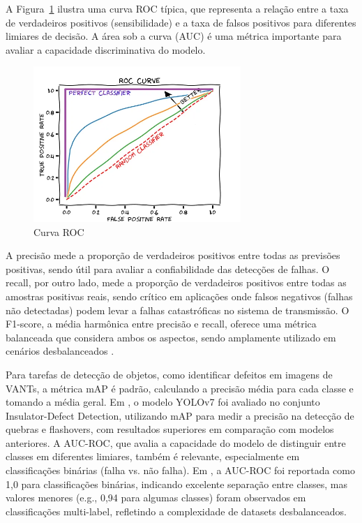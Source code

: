 A Figura~\ref{fig:roc_curve} ilustra uma curva ROC típica, que representa a relação entre a taxa de verdadeiros positivos (sensibilidade) e a taxa de falsos positivos para diferentes limiares de decisão. A área sob a curva (AUC) é uma métrica importante para avaliar a capacidade discriminativa do modelo.

\begin{figure}[H]
    \centering
    \caption{\label{fig:roc_curve}Curva ROC}
    \includegraphics[width=0.7\textwidth]{img/revisao_bibliografica/curva_roc.png}
\end{figure}

A precisão mede a proporção de verdadeiros positivos entre todas as previsões positivas, sendo útil para avaliar a confiabilidade das detecções de falhas. O recall, por outro lado, mede a proporção de verdadeiros positivos entre todas as amostras positivas reais, sendo crítico em aplicações onde falsos negativos (falhas não detectadas) podem levar a falhas catastróficas no sistema de transmissão. O F1-score, a média harmônica entre precisão e recall, oferece uma métrica balanceada que considera ambos os aspectos, sendo amplamente utilizado em cenários desbalanceados \cite{johnson2019survey}.

Para tarefas de detecção de objetos, como identificar defeitos em imagens de VANTs, a métrica mAP é padrão, calculando a precisão média para cada classe e tomando a média geral. Em , o modelo YOLOv7 foi avaliado no conjunto Insulator-Defect Detection, utilizando mAP para medir a precisão na detecção de quebras e flashovers, com resultados superiores em comparação com modelos anteriores. A AUC-ROC, que avalia a capacidade do modelo de distinguir entre classes em diferentes limiares, também é relevante, especialmente em classificações binárias (falha vs. não falha). Em , a AUC-ROC foi reportada como 1,0 para classificações binárias, indicando excelente separação entre classes, mas valores menores (e.g., 0,94 para algumas classes) foram observados em classificações multi-label, refletindo a complexidade de datasets desbalanceados.


